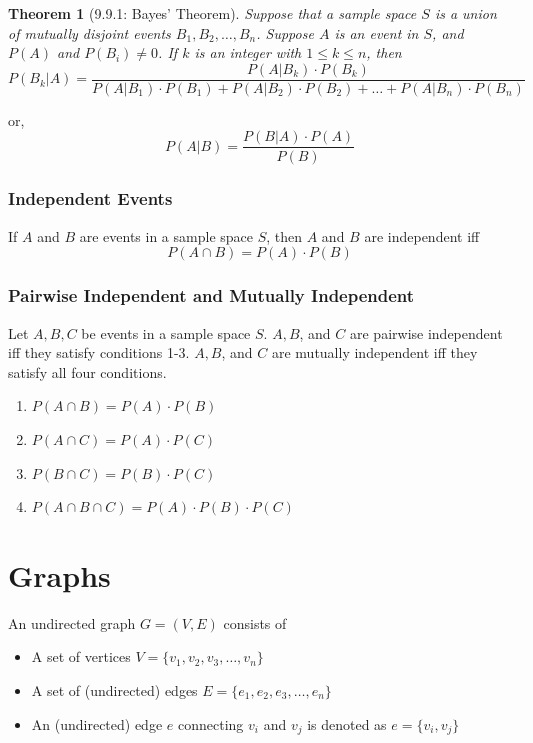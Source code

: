 \documentclass{article}
\theoremstyle{plain}
\newtheorem{theorem}{Theorem}[section]
\theoremstyle{definition}
\theoremstyle{remark}
\begin{document}
\begin{theorem}[9.9.1: Bayes' Theorem]
    Suppose that a sample space $S$ is a union of mutually disjoint events $B_1, B_2, \dots, B_n$. Suppose $A$ is an event in $S$, and $P(A)$ and $P(B_i) \neq 0$. If $k$ is an integer with $1 \leq k \leq n$, then
    \[ P(B_k|A) = \frac{P(A|B_k) \cdot P(B_k)}{P(A|B_1) \cdot P(B_1) + P(A|B_2) \cdot P(B_2) + \dots + P(A|B_n) \cdot P(B_n)} \]
\end{theorem}
 
or,
\[ P(A|B) = \frac{P(B|A) \cdot P(A)}{P(B)} \]
 
\subsubsection*{Independent Events}
If $A$ and $B$ are events in a sample space $S$, then $A$ and $B$ are independent iff
\[ P(A \cap B) = P(A) \cdot P(B) \]
 
\subsubsection*{Pairwise Independent and Mutually Independent}
Let $A, B, C$ be events in a sample space $S$. $A, B$, and $C$ are pairwise independent iff they satisfy conditions 1-3. $A, B$, and $C$ are mutually independent iff they satisfy all four conditions.
\begin{enumerate}
    \item $P(A \cap B) = P(A) \cdot P(B)$
    \item $P(A \cap C) = P(A) \cdot P(C)$
    \item $P(B \cap C) = P(B) \cdot P(C)$
    \item $P(A \cap B \cap C) = P(A) \cdot P(B) \cdot P(C)$
\end{enumerate}
 
\section{Graphs}
 
An undirected graph $G = (V, E)$ consists of
\begin{itemize}
    \item A set of vertices $V = \{v_1, v_2, v_3, \dots, v_n\}$
    \item A set of (undirected) edges $E = \{e_1, e_2, e_3, \dots, e_n\}$
    \item An (undirected) edge $e$ connecting $v_i$ and $v_j$ is denoted as $e = \{v_i, v_j\}$
\end{itemize}
 
\end{document}
